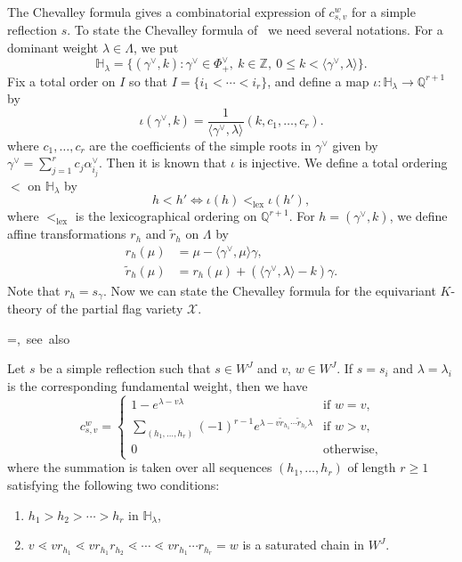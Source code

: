 \documentclass[ALCO,ThmDefs,Unicode,epreuves]{cedram}
\newcommand\Int{\mathbb{Z}}
\newcommand\Rat{\mathbb{Q}}
\renewcommand\tilde{\widetilde}
\DeclareMathOperator{\lex}{lex}
\newcommand\XX{\mathcal{X}}
\begin{document}
The Chevalley formula gives a combinatorial expression of $c^w_{s,v}$ for a simple reflection $s$.
To state the Chevalley formula of~\cite{LS} we need several notations.
For a dominant weight $\lambda \in \Lambda$, we put
$$
\mathbb{H}_\lambda
 =
\{ (\gamma^\vee, k) : 
 \gamma^\vee \in \Phi^\vee_+, \ k \in \Int, \ 0 \le k < \langle \gamma^\vee, \lambda \rangle
\}.
$$
Fix a total order on $I$ so that $I = \{ i_1 < \cdots < i_r \}$, 
and define a map $\iota : \mathbb{H}_\lambda \to \Rat^{r+1}$ by
$$
\iota \left(\gamma^\vee , k \right)
 =
\frac{ 1 }
 { \langle \gamma^\vee, \lambda \rangle }
\left( k, c_1, \ldots, c_r \right).
$$
where $c_1, \dots, c_r$ are the coefficients of the simple roots in $\gamma^\vee$ 
given by $\gamma^\vee = \sum_{j=1}^r c_j \alpha^\vee_{i_j}$.
Then it is known that $\iota$ is injective.
We define a total ordering $<$ on $\mathbb{H}_\lambda$ by
$$
h < h' \Longleftrightarrow \iota(h) <_{\lex} \iota(h'),
$$
where $<_{\lex}$ is the lexicographical ordering on $\Rat^{r+1}$.
For $h = (\gamma^\vee, k)$, we define affine transformations $r_h$ and $\tilde{r}_h$ on $\Lambda$ by
\begin{align*}
r_h(\mu) &= \mu - \langle \gamma^\vee, \mu \rangle \gamma,
\\
\tilde{r}_h(\mu) &= r_h(\mu) + \left( \langle \gamma^\vee, \lambda \rangle - k \right) \gamma.
\end{align*}
Note that $r_h = s_{\gamma}$.
Now we can state the Chevalley formula for the equivariant $K$-theory of the partial flag variety $\XX$.

\setbox\toto=\hbox {\cite[Theorem~4.8~(4.12) and~(4.13)]{LS}, see also~\cite[Corollary~7.1]{LP}}
\begin{prop}[\box\toto]
\label{prop:Chevalley}
Let $s$ be a simple reflection such that $s \in W^J$ and $v$, $w \in W^J$.
If $s = s_i$ and $\lambda = \lambda_i$ is the corresponding fundamental weight, then we have
\begin{equation}
\label{eq:Chevalley}
c^w_{s,v}
 =
\begin{cases}
 1 - e^{\lambda - v \lambda} &\text{if $w=v$},
\\
 \displaystyle\sum_{(h_1, \ldots, h_r)}
 (-1)^{r-1}
 e^{\lambda - v \tilde{r}_{h_1} \cdots \tilde{r}_{h_r} \lambda}
 &\text{if $w > v$,}
\\
 0 &\text{otherwise,}
\end{cases}
\end{equation}
where the summation is taken over all sequences $(h_1, \ldots, h_r)$ of length $r \ge 1$ 
satisfying the following two conditions:
\begin{enumerate}[(H1)]
\item\label{prop4.6_H1} %
$h_1 > h_2 > \cdots > h_r$ in $\mathbb{H}_\lambda$,
\item\label{prop4.6_H2} %
$v \lessdot v r_{h_1} \lessdot v r_{h_1} r_{h_2} \lessdot \cdots \lessdot v r_{h_1} \cdots r_{h_r} = w$ 
is a saturated chain in $W^J$.
\end{enumerate}
\end{prop}
\end{document}
